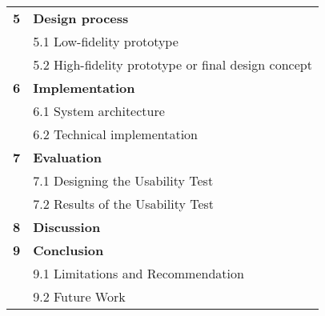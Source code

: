 \begin{table}[h]
{\begin{tabularx}{\textwidth}{@{} r Y @{}}
	\textbf{5}
	& \textbf{Design process}\vspace{2mm}\\
    & 5.1 Low-fidelity prototype\vspace{2mm}\\
    & 5.2 High-fidelity prototype or final design concept\vspace{2mm}\\
	\textbf{6}
	& \textbf{Implementation}\vspace{2mm}\\
    & 6.1 System architecture\vspace{2mm}\\
    & 6.2 Technical implementation\vspace{2mm}\\
	\textbf{7}
	& \textbf{Evaluation}\vspace{2mm}\\
    & 7.1 Designing the Usability Test\vspace{2mm}\\
    & 7.2 Results of the Usability Test\vspace{2mm}\\
	\textbf{8}
	& \textbf{Discussion}\vspace{2mm}\\
	\textbf{9}
	& \textbf{Conclusion}\vspace{2mm}\\
    & 9.1 Limitations and Recommendation\vspace{2mm}\\
    & 9.2 Future Work\vspace{2mm}\\
\end{tabularx}
}
\end{table}